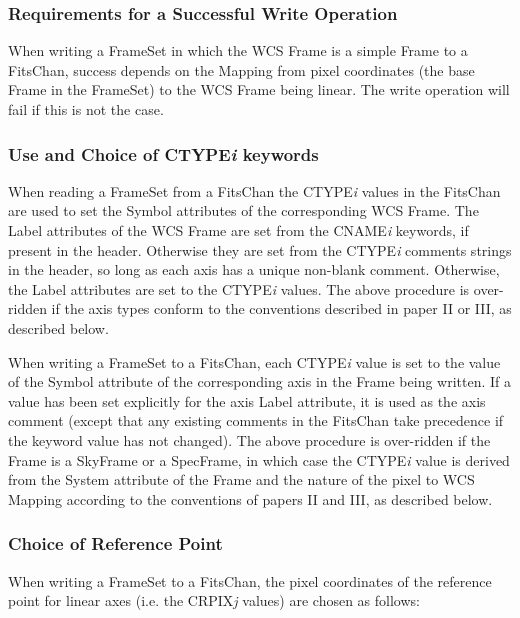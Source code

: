 \documentclass[twoside,11pt]{starlink}
\begin{document}
\subsubsection{Requirements for a Successful Write Operation}
When writing a FrameSet in which the WCS
Frame is a simple Frame to a FitsChan,
success depends on the Mapping from pixel coordinates
(the base Frame in the FrameSet) to the WCS Frame being linear. The write
operation will fail if this is not the case.

\subsubsection{Use and Choice of CTYPE\emph{i} keywords}
When reading a FrameSet from a FitsChan the CTYPE\emph{i} values in the FitsChan are used to set the
Symbol attributes of the corresponding WCS Frame. The Label attributes of the WCS Frame are set from
the CNAME\emph{i} keywords, if present in the header. Otherwise they are set
from the CTYPE\emph{i} comments strings in the header, so long as each
axis has a unique non-blank comment. Otherwise, the Label attributes are
set to the CTYPE\emph{i} values. The above procedure is over-ridden if
the axis types conform to the conventions described in paper II or III,
as described below.

When writing a FrameSet to a FitsChan, each CTYPE\emph{i} value is set to
the value of the Symbol attribute of the corresponding axis in the Frame
being written. If a value has been set explicitly for the axis Label
attribute, it is used as the axis comment (except that any existing
comments in the FitsChan take precedence if the keyword value has not
changed). The above procedure is over-ridden if the Frame is a
SkyFrame or a SpecFrame, in which
case the CTYPE\emph{i} value is derived from the System
attribute of the Frame and the nature of the pixel to WCS Mapping
according to the conventions of papers II and III, as described below.

\subsubsection{Choice of Reference Point}
When writing a FrameSet to a
FitsChan, the pixel coordinates of the
reference point for linear axes (i.e. the CRPIX\emph{j} values) are
chosen as follows:
\end{document}
